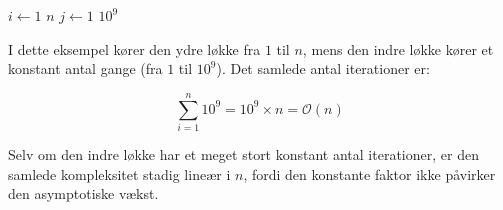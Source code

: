 \begin{example}

    \begin{codebox}
        \li \For $i \gets 1$ \To $n$ \Do
        \li     \For $j \gets 1$ \To $10^9$ \Do
        \li         {}
                \End
            \End
    \end{codebox}

    I dette eksempel kører den ydre løkke fra $1$ til $n$, mens den indre løkke kører et konstant antal gange (fra $1$ til $10^9$). Det samlede antal iterationer er:

    \[
    \sum_{i=1}^{n} 10^9 = 10^9 \times n = \mathcal{O}(n)
    \]

    Selv om den indre løkke har et meget stort konstant antal iterationer, er den samlede kompleksitet stadig lineær i $n$, fordi den konstante faktor ikke påvirker den asymptotiske vækst.
\end{example}

